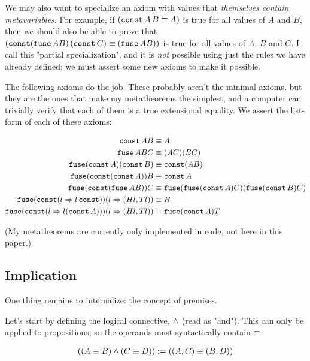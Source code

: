 \documentclass{article}
\begin{document}
  We may also want to specialize an axiom with values that \emph{themselves contain metavariables}. For example, if $(\operatorname{\texttt{const}} A\, B \equiv A)$ is true for all values of $A$ and $B$, then we should also be able to prove that $(\operatorname{\texttt{const}} (\operatorname{\texttt{fuse}} A B)\, (\operatorname{\texttt{const}} C) \equiv (\operatorname{\texttt{fuse}} A B))$ is true for all values of $A$, $B$ and $C$. I call this "partial specialization", and it is \emph{not} possible using just the rules we have already defined; we must assert some new axioms to make it possible.
  
  The following axioms do the job. These probably aren't the minimal axioms, but they are the ones that make my metatheorems the simplest, and a computer can trivially verify that each of them is a true extensional equality. We assert the list-form of each of these axioms:
  
  \begin{align*}
  \operatorname{\texttt{const}} A B &\equiv A\\
\operatorname{\texttt{fuse}} A B C &\equiv (A C) (B C)\\
\operatorname{\texttt{fuse}} (\operatorname{\texttt{const}} A) (\operatorname{\texttt{const}} B) &\equiv \operatorname{\texttt{const}} (A B)\\
\operatorname{\texttt{fuse}} (\operatorname{\texttt{const}} (\operatorname{\texttt{const}} A)) B &\equiv \operatorname{\texttt{const}} A\\
\operatorname{\texttt{fuse}} (\operatorname{\texttt{const}} (\operatorname{\texttt{fuse}} A B)) C &\equiv \operatorname{\texttt{fuse}} (\operatorname{\texttt{fuse}} (\operatorname{\texttt{const}} A) C) (\operatorname{\texttt{fuse}} (\operatorname{\texttt{const}} B) C)\\
\operatorname{\texttt{fuse}} (\operatorname{\texttt{const}} (l \Rightarrow l \operatorname{\texttt{const}})) (l \Rightarrow (Hl, Tl)) &\equiv H\\
\operatorname{\texttt{fuse}} (\operatorname{\texttt{const}} (l \Rightarrow l (\operatorname{\texttt{const}} A))) (l \Rightarrow (Hl, Tl)) &\equiv \operatorname{\texttt{fuse}} (\operatorname{\texttt{const}} A) T\\
   \end{align*}
   
  (My metatheorems are currently only implemented in code, not here in this paper.)
 
  \subsection{Implication}
  
  One thing remains to internalize: the concept of premises.
  
  Let's start by defining the logical connective, $\wedge$ (read as "and"). This can only be applied to propositions, so the operands must syntactically contain $\equiv$:
  
  \begin{align*}
    ((A \equiv B) \wedge (C \equiv D)):= ((A,C) \equiv (B,D)) 
  \end{align*}
  
\end{document}
